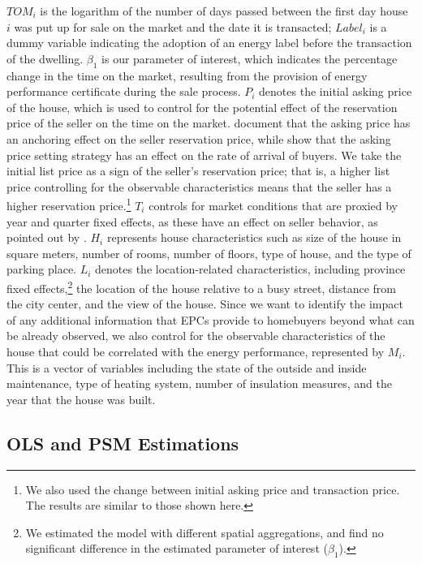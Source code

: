 \documentclass[12pt]{article}
\begin{document}
$TOM_i$ is the logarithm of the number of days passed between the first day house $i$ was put up for sale on the market and the date it is transacted; $Label_i$ is a dummy variable indicating the adoption of an energy label before the transaction of the dwelling. $\beta_1$ is our parameter of interest, which indicates the percentage change in the time on the market, resulting from the provision of energy performance certificate during the sale process. $P_i$ denotes the initial asking price of the house, which is used to control for the potential effect of the reservation price of the seller on the time on the market. \cite{black1996use} document that the asking price has an anchoring effect on the seller reservation price, while \cite{han2016role} show that the asking price setting strategy has an effect on the rate of arrival of buyers. We take the initial list price as a sign of the seller's reservation price; that is, a higher list price controlling for the observable characteristics means that the seller has a higher reservation price.\footnote{We also used the change between initial asking price and transaction price. The results are similar to those shown here.} $T_i$ controls for market conditions that are proxied by year and quarter fixed effects, as these have an effect on seller behavior, as pointed out by \cite{cheng2010home}. $H_i$ represents house characteristics such as size of the house in square meters, number of rooms, number of floors, type of house, and the type of parking place. $L_i$ denotes the location-related characteristics, including province fixed effects,\footnote{We estimated the model with different spatial aggregations, and find no significant difference in the estimated parameter of interest ($\beta_1$).} the location of the house relative to a busy street, distance from the city center, and the view of the house. Since we want to identify the impact of any additional information that EPCs provide to homebuyers beyond what can be already observed, we also control for the observable characteristics of the house that could be correlated with the energy performance, represented by $M_i$. This is a vector of variables including the state of the outside and inside maintenance, type of heating system, number of insulation measures, and the year that the house was built.

\subsection{OLS and PSM Estimations}
\end{document}
